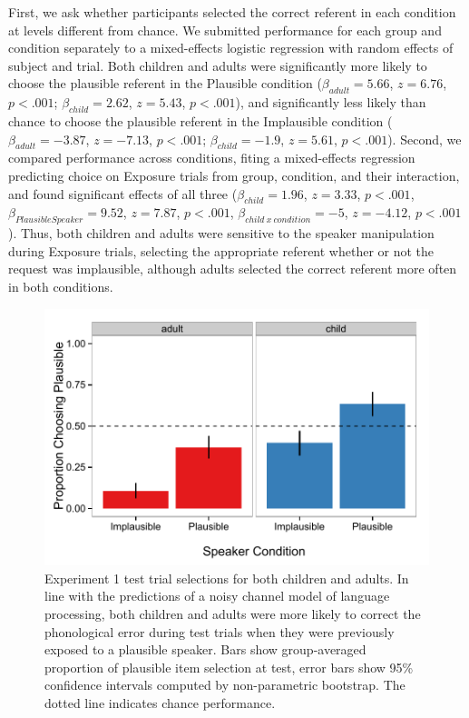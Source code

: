 \documentclass[man,floatsintext]{apa6}
\begin{document}
First, we ask whether participants selected the correct referent in each condition at levels different from chance. We submitted performance for each group and condition separately to a mixed-effects logistic regression with random effects of subject and trial. Both children and adults were significantly more likely to choose the plausible referent in the Plausible condition ($\beta_{adult} = 5.66$, $z = 6.76$, $p <.001$; $\beta_{child} = 2.62$, $z = 5.43$, $p <.001$), and significantly less likely than chance to choose the plausible referent in the Implausible condition ($\beta_{adult} = -3.87$, $z = -7.13$, $p <.001$; $\beta_{child} = -1.9$, $z = 5.61$, $p <.001$). Second, we compared performance across conditions, fiting a mixed-effects regression predicting choice on Exposure trials from group, condition, and their interaction, and found significant effects of all three ($\beta_{child} = 1.96$,  $z = 3.33$, $p <.001$, $\beta_{Plausible Speaker} = 9.52$,  $z = 7.87$, $p <.001$,  $\beta_{child\: x \: condition} = -5$,  $z = -4.12$, $p <.001$). Thus, both children and adults were sensitive to the speaker manipulation during Exposure trials, selecting the appropriate referent whether or not the request was implausible, although adults selected the correct referent more often in both conditions.

\begin{figure}[t]
\centering
     \includegraphics[width=5in]{figures/exp1_results.pdf}
    \caption{Experiment 1 test trial selections for both children and adults. In line with the predictions of a noisy channel model of language processing, both children and adults were more likely to correct the phonological error during test trials when they were previously exposed to a plausible speaker. Bars show group-averaged proportion of plausible item selection at test, error bars show 95\% confidence intervals computed by non-parametric bootstrap. The dotted line indicates chance performance.}%
   \label{fig:exp1_results}
\end{figure}
\end{document}
